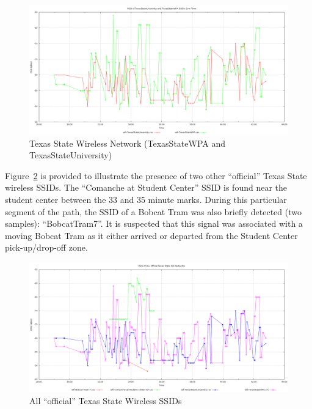 \documentclass[journal,twocolumn]{IEEEtran}
\begin{document}
\begin{figure}
\begin{center}
\includegraphics[scale=0.3]{wifi-data/003-texas-state-wireless.png}
\caption{Texas State Wireless Network (TexasStateWPA and TexasStateUniversity)}
\label{fig_wifi_3}
\end{center}
\end{figure}

Figure~\ref{fig_wifi_4} is provided to illustrate the presence of two other 
``official'' Texas State wireless SSIDs. The ``Comanche at Student Center'' 
SSID is found near the student center between the 33 and 35 minute marks. 
During this particular segment of the path, the SSID of a Bobcat Tram 
was also briefly detected (two samples): ``BobcatTram7''. It is suspected that
this signal was associated with a moving Bobcat Tram as it either arrived or 
departed from the Student Center pick-up/drop-off zone.

\begin{figure}
\begin{center}
\includegraphics[scale=0.3]{wifi-data/004-official-txstate.png}
\caption{All ``official'' Texas State Wireless SSIDs}
\label{fig_wifi_4}
\end{center}
\end{figure}
\end{document}
